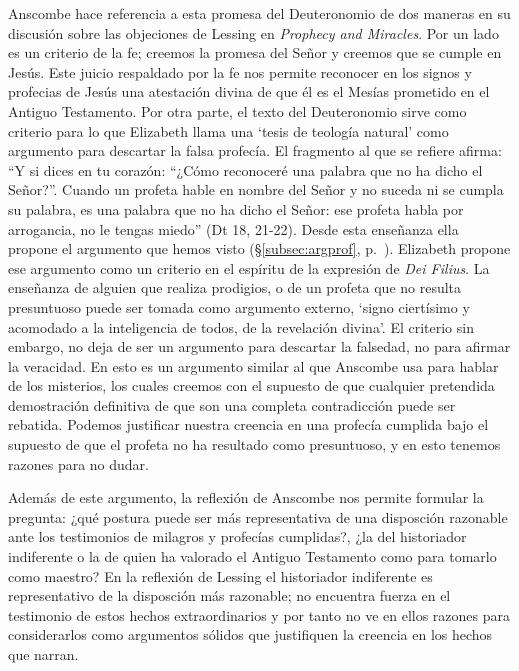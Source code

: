 Anscombe hace referencia a esta promesa del Deuteronomio de dos maneras en su discusión sobre las objeciones de Lessing en \emph{Prophecy and Miracles}. Por un lado es un criterio de la fe; creemos la promesa del Señor y creemos que se cumple en Jesús. Este juicio respaldado por la fe nos permite reconocer en los signos y profecias de Jesús una atestación divina de que él es el Mesías prometido en el Antiguo Testamento. Por otra parte, el texto del Deuteronomio sirve como criterio para lo que Elizabeth llama una `tesis de teología natural' como argumento para descartar la falsa profecía. El fragmento al que se refiere afirma: \enquote{Y si dices en tu corazón: ``¿Cómo reconoceré una palabra que no ha dicho el Señor?''. Cuando un profeta hable en nombre del Señor y no suceda ni se cumpla su palabra, es una palabra que no ha dicho el Señor: ese profeta habla por arrogancia, no le tengas miedo} (Dt 18, 21-22). Desde esta enseñanza ella propone el argumento que hemos visto (\S\ref{subsec:argprof}, p.~\pageref{subsec:argprof}).
Elizabeth propone ese argumento como un criterio en el espíritu de la expresión de \emph{Dei Filius}. La enseñanza de alguien que realiza prodigios, o de un profeta que no resulta presuntuoso puede ser tomada como argumento externo, \enquote*{signo ciertísimo y acomodado a la inteligencia de todos, de la revelación divina}. El criterio sin embargo, no deja de ser un argumento para descartar la falsedad, no para afirmar la veracidad. En esto es un argumento similar al que Anscombe usa para hablar de los misterios, los cuales creemos con el supuesto de que cualquier pretendida demostración definitiva de que son una completa contradicción puede ser rebatida. Podemos justificar nuestra creencia en una profecía cumplida bajo el supuesto de que el profeta no ha resultado como presuntuoso, y en esto tenemos razones para no dudar.

Además de este argumento, la reflexión de Anscombe nos permite formular la pregunta: ¿qué postura puede ser más representativa de una disposción razonable ante los testimonios de milagros y profecías cumplidas?, ¿la del historiador indiferente o la de quien ha valorado el Antiguo Testamento como para tomarlo como maestro? En la reflexión de Lessing el historiador indiferente es representativo de la disposción más razonable; no encuentra fuerza en el testimonio de estos hechos extraordinarios y por tanto no ve en ellos razones para considerarlos como argumentos sólidos que justifiquen la creencia en los hechos que narran.

